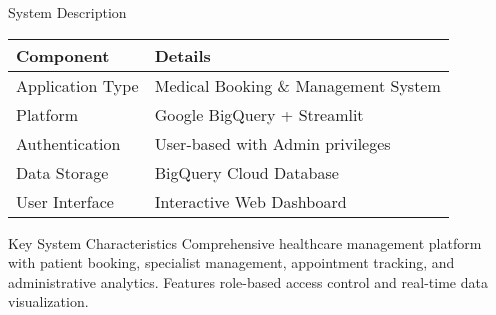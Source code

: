 \documentclass[aspectratio=169]{beamer}
\begin{document}
\begin{frame}{System Description}
\begin{table}[h]
\centering
\begin{tabular}{@{}ll@{}}
\toprule
\textbf{Component} & \textbf{Details} \\
\midrule
Application Type & Medical Booking \& Management System \\
Platform & Google BigQuery + Streamlit \\
Authentication & User-based with Admin privileges \\
Data Storage & BigQuery Cloud Database \\
User Interface & Interactive Web Dashboard \\
\bottomrule
\end{tabular}
\end{table}

\vspace{0.5cm}

\begin{alertblock}{Key System Characteristics}
Comprehensive healthcare management platform with patient booking, specialist management, appointment tracking, and administrative analytics. Features role-based access control and real-time data visualization.
\end{alertblock}
\end{frame}
\end{document}
